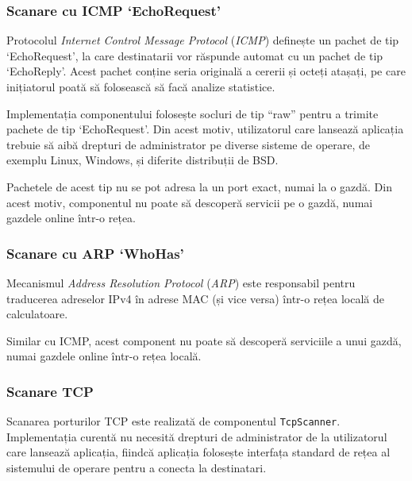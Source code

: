 \subsubsection*{Scanare cu ICMP `EchoRequest'}

	Protocolul \textit{Internet Control Message Protocol} (\textit{ICMP}) definește un pachet de tip `EchoRequest', la care destinatarii vor răspunde automat cu un pachet de tip `EchoReply'. Acest pachet conține seria originală a cererii și octeți atașați, pe care inițiatorul poată să folosească să facă analize statistice.
	
	Implementația componentului folosește socluri de tip ``raw'' pentru a trimite pachete de tip `EchoRequest'. Din acest motiv, utilizatorul care lansează aplicația trebuie să aibă drepturi de administrator pe diverse sisteme de operare, de exemplu Linux, Windows, și diferite distribuții de BSD.
	
	Pachetele de acest tip nu se pot adresa la un port exact, numai la o gazdă. Din acest motiv, componentul nu poate să descoperă servicii pe o gazdă, numai gazdele online într-o rețea.

\subsubsection*{Scanare cu ARP `WhoHas'}

	Mecanismul \textit{Address Resolution Protocol} (\textit{ARP}) este responsabil pentru traducerea adreselor IPv4 în adrese MAC (și vice versa) într-o rețea locală de calculatoare.
	
	Similar cu ICMP, acest component nu poate să descoperă serviciile a unui gazdă, numai gazdele online într-o rețea locală.

\subsubsection*{Scanare TCP}

	Scanarea porturilor TCP este realizată de componentul \texttt{TcpScanner}. Implementația curentă nu necesită drepturi de administrator de la utilizatorul care lansează aplicația, fiindcă aplicația folosește interfața standard de rețea al sistemului de operare pentru a conecta la destinatari.
	
